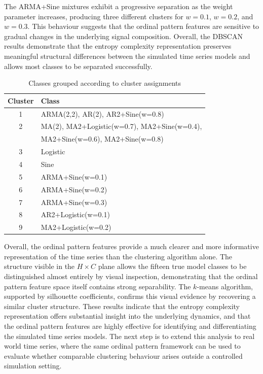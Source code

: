 \documentclass[12pt,a4paper]{article}
\begin{document}
The ARMA+Sine mixtures exhibit a progressive separation as the weight parameter increases, producing three different clusters for $w=0.1$, $w=0.2$, and $w=0.3$. This behaviour suggests that the ordinal pattern features are sensitive to gradual changes in the underlying signal composition. Overall, the DBSCAN results demonstrate that the entropy complexity representation preserves meaningful structural differences between the simulated time series models and allows most classes to be separated successfully.

\begin{table}[ht]
	\centering
	\caption{Classes grouped according to cluster assignments}
	\begin{tabular}{cl}
		\hline
		\textbf{Cluster} & \textbf{Class} \\
		\hline
		1 & ARMA(2,2), AR(2), AR2+Sine(w=0.8) \\
		2 & MA(2), MA2+Logistic(w=0.7), MA2+Sine(w=0.4), \\
		& MA2+Sine(w=0.6), MA2+Sine(w=0.8) \\
		3 & Logistic \\
		4 & Sine \\
		5 & ARMA+Sine(w=0.1) \\
		6 & ARMA+Sine(w=0.2) \\
		7 & ARMA+Sine(w=0.3) \\
		8 & AR2+Logistic(w=0.1) \\
		9 & MA2+Logistic(w=0.2) \\
		\hline
	\end{tabular}
	\label{tab:cluster_grouped}
\end{table} 

Overall, the ordinal pattern features provide a much clearer and more informative representation of the time series than the clustering algorithm alone. 
The structure visible in the $H \times C$ plane allows the fifteen true model classes to be distinguished almost entirely by visual inspection, demonstrating that the ordinal pattern feature space itself contains strong separability. 
The $k$-means algorithm, supported by silhouette coefficients, confirms this visual evidence by recovering a similar cluster structure. 
These results indicate that the entropy complexity representation offers substantial insight into the underlying dynamics, and that the ordinal pattern features are highly effective for identifying and differentiating the simulated time series models. 
The next step is to extend this analysis to real world time series, where the same ordinal pattern framework can be used to evaluate whether comparable clustering behaviour arises outside a controlled simulation setting.
	
	
	
	
	
\end{document}

